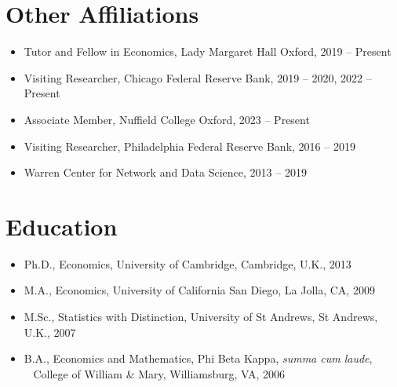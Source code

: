 \documentclass[line,overlapped]{myres}
\begin{document}
\begin{resume}
\section{\sc Other Affiliations}
\begin{itemize}
\item Tutor and Fellow in Economics, Lady Margaret Hall Oxford, 2019 -- Present
\item Visiting Researcher, Chicago Federal Reserve Bank, 2019 -- 2020, 2022 -- Present
\item Associate Member, Nuffield College Oxford, 2023 -- Present
\item Visiting Researcher, Philadelphia Federal Reserve Bank, 2016 -- 2019
\item Warren Center for Network and Data Science, 2013 -- 2019 
\end{itemize}

\section{\sc Education}
\begin{itemize}
\item Ph.D., Economics, University of Cambridge, Cambridge, U.K., 2013
\item M.A., Economics, University of California San Diego, La Jolla, CA, 2009
\item M.Sc., Statistics with Distinction, University of St Andrews, St Andrews, U.K., 2007
\item B.A., Economics and Mathematics, Phi Beta Kappa, \emph{summa cum laude},\\ 
  \-\ \hspace{1em} College of William \& Mary, Williamsburg, VA, 2006
\end{itemize}





\end{resume}
\end{document}
